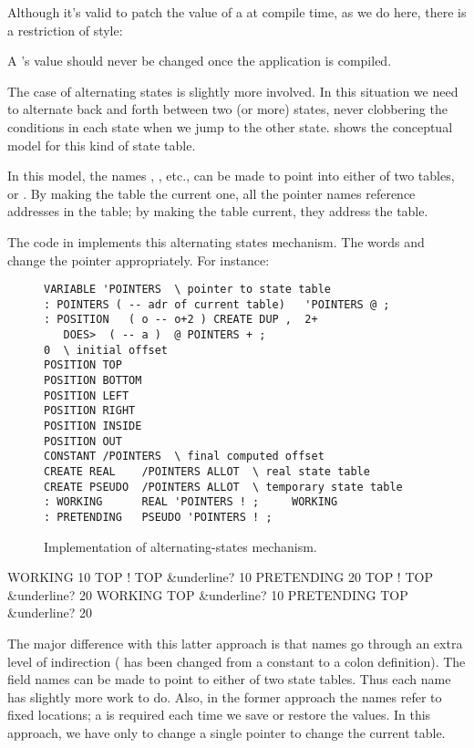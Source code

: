 Although it's valid to patch the value of a  at compile
time, as we do here, there is a restriction of style:

\begin{tip}
A 's value should never be changed once the application is
compiled.
\end{tip}
The case of alternating states is slightly more involved. In this situation
we need to alternate back and forth between two (or more) states, never
clobbering the conditions in each state when we jump to the other state.
 shows the conceptual model for this kind of state table.



In this model, the names , , etc., can be
made to point into either of two tables,  or
. By making the  table the current one, all
the pointer names reference addresses in the  table; by
making the  table current, they address the
 table.

The code in  implements this alternating states mechanism.
The words  and  change the pointer
appropriately. For instance:

\begin{figure*}[bbbt]
\caption{Implementation of alternating-states mechanism.}
\begin{center}
\begin{BVerbatim}
VARIABLE 'POINTERS  \ pointer to state table
: POINTERS ( -- adr of current table)   'POINTERS @ ;
: POSITION   ( o -- o+2 ) CREATE DUP ,  2+
   DOES>  ( -- a )  @ POINTERS + ;
0  \ initial offset
POSITION TOP
POSITION BOTTOM
POSITION LEFT
POSITION RIGHT
POSITION INSIDE
POSITION OUT
CONSTANT /POINTERS  \ final computed offset
CREATE REAL    /POINTERS ALLOT  \ real state table
CREATE PSEUDO  /POINTERS ALLOT  \ temporary state table
: WORKING      REAL 'POINTERS ! ;     WORKING
: PRETENDING   PSEUDO 'POINTERS ! ;
\end{BVerbatim}
\end{center}
\end{figure*}

\begin{Code}[commandchars=&\{\}]
WORKING
10 TOP !
TOP &underline{? 10}
PRETENDING
20 TOP !
TOP &underline{? 20}
WORKING
TOP &underline{? 10}
PRETENDING
TOP &underline{? 20}
\end{Code}
The major difference with this latter approach is that names go through
an extra level of indirection ( has been changed from a
constant to a colon definition). The field names can be made to point to
either of two state tables. Thus each name has slightly more work to do.
Also, in the former approach the names refer to fixed locations; a
 is required each time we save or restore the values. In this
approach, we have only to change a single pointer to change the current
table.%

